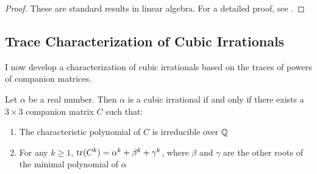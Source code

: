 \begin{proof}
These are standard results in linear algebra. For a detailed proof, see \cite{Horn2012}.
\end{proof}

\subsection{Trace Characterization of Cubic Irrationals}

I now develop a characterization of cubic irrationals based on the traces of powers of companion matrices.

\begin{theorem}\label{thm:matrix_cubic}
Let $\alpha$ be a real number. Then $\alpha$ is a cubic irrational if and only if there exists a $3 \times 3$ companion matrix $C$ such that:
\begin{enumerate}
    \item The characteristic polynomial of $C$ is irreducible over $\mathbb{Q}$
    \item For any $k \geq 1$, $\operatorname{tr}(C^k) = \alpha^k + \beta^k + \gamma^k$, where $\beta$ and $\gamma$ are the other roots of the minimal polynomial of $\alpha$
\end{enumerate}
\end{theorem}

